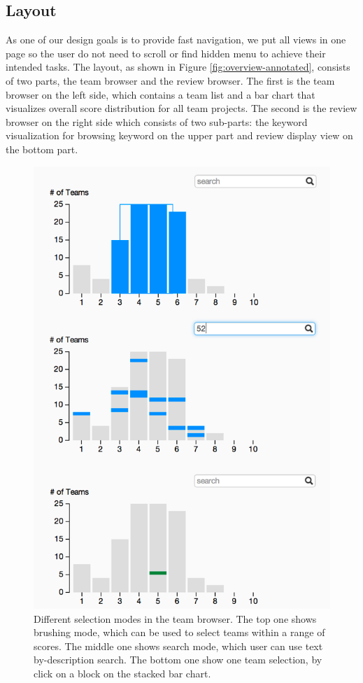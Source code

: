 \documentclass{sigchi}
\begin{document}
\subsection{Layout}
As one of our design goals is to provide fast navigation,
we put all views in one page so the user do not need to scroll or find hidden
menu to achieve their intended tasks. The layout, as shown in Figure
\ref{fig:overview-annotated}, consists of two parts,
the team browser and the review
browser.  The first is the team browser on the left side, which contains a
team list and a bar chart that visualizes overall score distribution for all
team projects. The second is the review browser on the right side which
consists of two sub-parts: the keyword visualization for browsing keyword on
the upper part and review display view on the bottom part.

\begin{figure}[]
\centering
\includegraphics[width=\columnwidth]{images/3charts}
\caption{Different selection modes in the team browser.
The top one shows brushing mode, which can be used to select teams within a range of scores.
The middle one shows search mode, which user can use text by-description search.
The bottom one show one team selection, by click on a block on the stacked bar chart.}
\label{fig:keyword-lists}
\end{figure}
\end{document}
